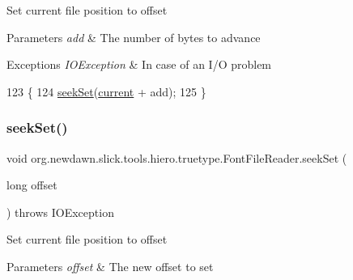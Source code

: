 Set current file position to offset


\begin{DoxyParams}{Parameters}
{\em add} & The number of bytes to advance \\
\hline
\end{DoxyParams}

\begin{DoxyExceptions}{Exceptions}
{\em I\+O\+Exception} & In case of an I/O problem \\
\hline
\end{DoxyExceptions}

\begin{DoxyCode}
123                                                      \{
124         \mbox{\hyperlink{classorg_1_1newdawn_1_1slick_1_1tools_1_1hiero_1_1truetype_1_1_font_file_reader_a9697638485df75a15d10c8b41847241d}{seekSet}}(\mbox{\hyperlink{classorg_1_1newdawn_1_1slick_1_1tools_1_1hiero_1_1truetype_1_1_font_file_reader_ab082d04b7f0a287496055b8e5f203cb4}{current}} + add);
125     \}
\end{DoxyCode}
\mbox{\label{classorg_1_1newdawn_1_1slick_1_1tools_1_1hiero_1_1truetype_1_1_font_file_reader_a9697638485df75a15d10c8b41847241d}} 
\subsubsection{\texorpdfstring{seek\+Set()}{seekSet()}}
{\footnotesize\ttfamily void org.\+newdawn.\+slick.\+tools.\+hiero.\+truetype.\+Font\+File\+Reader.\+seek\+Set (\begin{DoxyParamCaption}\item[{long}]{offset }\end{DoxyParamCaption}) throws I\+O\+Exception\hspace{0.3cm}{\ttfamily [inline]}}

Set current file position to offset


\begin{DoxyParams}{Parameters}
{\em offset} & The new offset to set \\
\hline
\end{DoxyParams}

